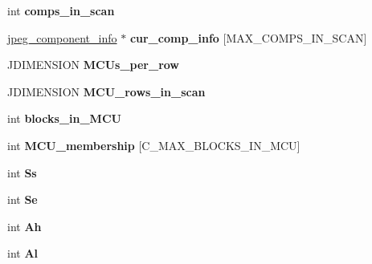 \begin{DoxyCompactItemize}
int {\bfseries comps\+\_\+in\+\_\+scan}
\item 
\mbox{\label{structjpeg__compress__struct_af44e10655b0d040e79a2d639dec7d000}} 
\hyperlink{structjpeg__component__info}{jpeg\+\_\+component\+\_\+info} $\ast$ {\bfseries cur\+\_\+comp\+\_\+info} \mbox{[}M\+A\+X\+\_\+\+C\+O\+M\+P\+S\+\_\+\+I\+N\+\_\+\+S\+C\+AN\mbox{]}
\item 
\mbox{\label{structjpeg__compress__struct_a97f0c5e0ae932d1810007077443da684}} 
J\+D\+I\+M\+E\+N\+S\+I\+ON {\bfseries M\+C\+Us\+\_\+per\+\_\+row}
\item 
\mbox{\label{structjpeg__compress__struct_ab605396740a26114095bf99c7c7349fb}} 
J\+D\+I\+M\+E\+N\+S\+I\+ON {\bfseries M\+C\+U\+\_\+rows\+\_\+in\+\_\+scan}
\item 
\mbox{\label{structjpeg__compress__struct_ac32cf016a916984f68f158e5310a16bb}} 
int {\bfseries blocks\+\_\+in\+\_\+\+M\+CU}
\item 
\mbox{\label{structjpeg__compress__struct_a82b407a757dce1422123269d74965ef2}} 
int {\bfseries M\+C\+U\+\_\+membership} \mbox{[}C\+\_\+\+M\+A\+X\+\_\+\+B\+L\+O\+C\+K\+S\+\_\+\+I\+N\+\_\+\+M\+CU\mbox{]}
\item 
\mbox{\label{structjpeg__compress__struct_adda4b7ef0dda94b38b6e34df42769d81}} 
int {\bfseries Ss}
\item 
\mbox{\label{structjpeg__compress__struct_af2c1fe7c62791cda75219c10d71132d9}} 
int {\bfseries Se}
\item 
\mbox{\label{structjpeg__compress__struct_a301a95efc904d22aca78592f7a21673a}} 
int {\bfseries Ah}
\item 
\mbox{\label{structjpeg__compress__struct_a4160152697f6042b8fe1d6838a8118e2}} 
int {\bfseries Al}
\item 
\mbox{\label{structjpeg__compress__struct_aad43e172d1ec5dd1e369b72ed8753410}} 

\end{DoxyCompactItemize}
